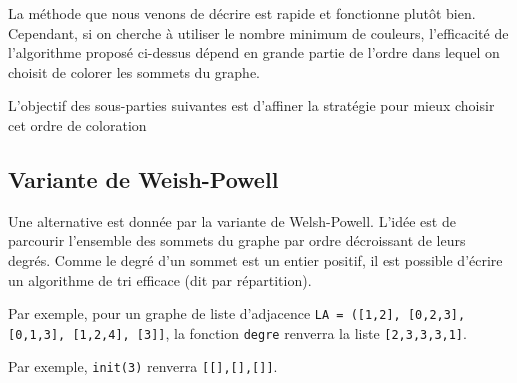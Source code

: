 \ifprof
\begin{corrige}

\end{corrige}
\else
\fi

La méthode que nous venons de décrire est rapide et fonctionne plutôt bien. Cependant, si on cherche à utiliser le nombre minimum de couleurs, l'efficacité de l'algorithme proposé ci-dessus dépend en grande partie de l'ordre dans lequel on choisit de colorer les sommets du graphe. 

L'objectif des sous-parties suivantes est d'affiner la stratégie pour mieux choisir cet ordre de coloration


\subsection{Variante de Weish-Powell}
Une alternative est donnée par la variante de Welsh-Powell. L'idée est de parcourir l'ensemble des sommets du graphe par ordre décroissant de leurs degrés.
Comme le degré d'un sommet est un entier positif, il est possible d'écrire un algorithme de tri efficace (dit par répartition).



Par exemple, pour un graphe de liste d'adjacence \lstinline{LA = ([1,2], [0,2,3], [0,1,3], [1,2,4], [3]]}, la fonction \lstinline{degre} renverra la liste \lstinline{[2,3,3,3,1]}.

\ifprof
\begin{corrige}

\end{corrige}
\else
\fi


Par exemple, \lstinline{init(3)} renverra \lstinline{[[],[],[]]}.

\ifprof
\begin{corrige}

\end{corrige}
\else
\fi

